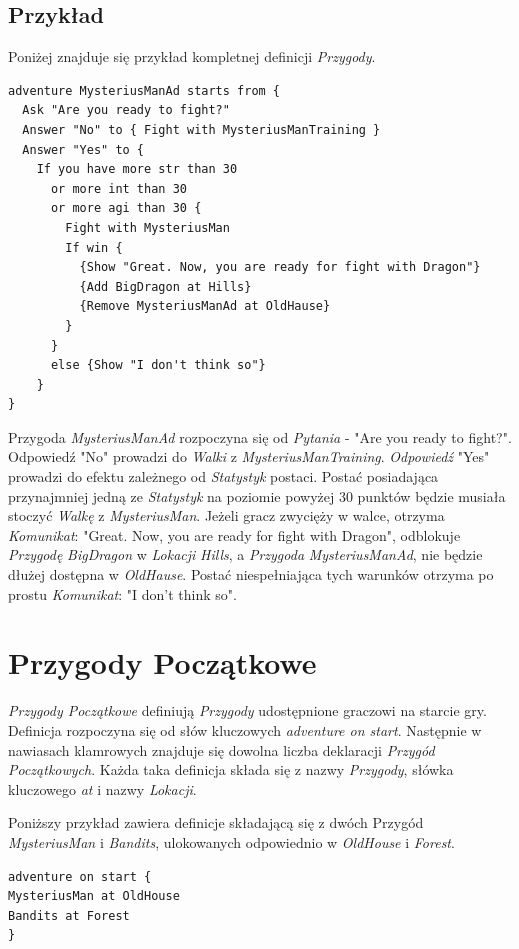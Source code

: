 \documentclass[openright]{xmgr}
\begin{document}
\subsection*{Przykład}
Poniżej znajduje się przykład kompletnej definicji \textit{Przygody}.
\begin{verbatim}
adventure MysteriusManAd starts from {
  Ask "Are you ready to fight?"
  Answer "No" to { Fight with MysteriusManTraining }
  Answer "Yes" to {
    If you have more str than 30 
      or more int than 30 
      or more agi than 30 {
        Fight with MysteriusMan
        If win {
          {Show "Great. Now, you are ready for fight with Dragon"}
          {Add BigDragon at Hills}
          {Remove MysteriusManAd at OldHause}
        }
      }
      else {Show "I don't think so"}
    }
}
\end{verbatim}
Przygoda \textit{MysteriusManAd} rozpoczyna się od \textit{Pytania} - "Are you ready to fight?". Odpowiedź "No" prowadzi do \textit{Walki} z \textit{MysteriusManTraining}.
\textit{Odpowiedź} "Yes" prowadzi do efektu zależnego od \textit{Statystyk} postaci. Postać posiadająca przynajmniej jedną ze \textit{Statystyk} na poziomie powyżej 30 punktów będzie musiała stoczyć \textit{Walkę} z \textit{MysteriusMan}. Jeżeli gracz zwycięży w walce, otrzyma \textit{Komunikat}: "Great. Now, you are ready for fight with Dragon", odblokuje \textit{Przygodę} \textit{BigDragon} w \textit{Lokacji} \textit{Hills}, a \textit{Przygoda} \textit{MysteriusManAd}, nie będzie dłużej dostępna w \textit{OldHause}. Postać niespełniająca tych warunków otrzyma po prostu \textit{Komunikat}: "I don't think so". 

\section{Przygody Początkowe} 
\textit{Przygody Początkowe} definiują \textit{Przygody} udostępnione graczowi na starcie gry. Definicja rozpoczyna się od słów kluczowych \textit{adventure on start}. Następnie w nawiasach klamrowych znajduje się dowolna liczba deklaracji \textit{Przygód Początkowych}.
Każda taka definicja składa się z nazwy \textit{Przygody}, słówka kluczowego \textit{at} i nazwy \textit{Lokacji}.

Poniższy przykład zawiera definicje składającą się z dwóch Przygód \textit{MysteriusMan} i \textit{Bandits}, ulokowanych odpowiednio w \textit{OldHouse} i \textit{Forest}.

\begin{verbatim}
adventure on start {
MysteriusMan at OldHouse
Bandits at Forest
}
\end{verbatim}
\end{document}
